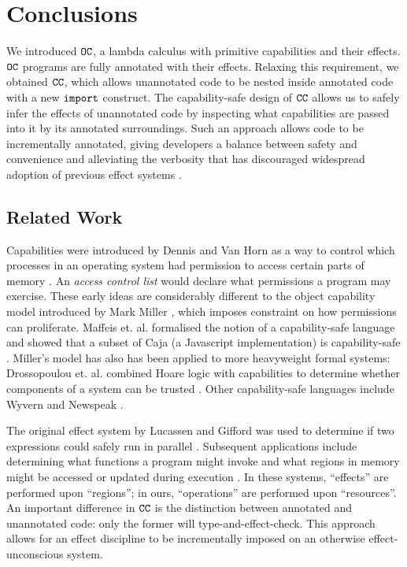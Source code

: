 
\section{Conclusions}

We introduced $\mathtt{OC}$, a lambda calculus with primitive capabilities and their effects. $\mathtt{OC}$ programs are fully annotated with their effects. Relaxing this requirement, we obtained $\mathtt{CC}$, which allows unannotated code to be nested inside annotated code with a new $\mathtt{import}$ construct. The capability-safe design of $\mathtt{CC}$ allows us to safely infer the effects of unannotated code by inspecting what capabilities are passed into it by its annotated surroundings. Such an approach allows code to be incrementally annotated, giving developers a balance between safety and convenience and alleviating the verbosity that has discouraged widespread adoption of previous effect systems \cite{rytz2012}.

\subsection{Related Work}

Capabilities were introduced by Dennis and Van Horn as a way to control which processes in an operating system had permission to access certain parts of memory \cite{dennis66}. An \textit{access control list} would declare what permissions a program may exercise. These early ideas are considerably different to the object capability model introduced by Mark Miller \cite{miller06}, which imposes constraint on how permissions can proliferate. Maffeis et. al. formalised the notion of a capability-safe language and showed that a subset of Caja (a Javascript implementation) is capability-safe \cite{maffeis10}. Miller's model has also has been applied to more heavyweight formal systems: Drossopoulou et. al. combined Hoare logic with capabilities to determine whether components of a system can be trusted \cite{drossopoulou07}. Other capability-safe languages include Wyvern \cite{nistor13} and Newspeak \cite{bracha10}.

The original effect system by Lucassen and Gifford was used to determine if two expressions could safely run in parallel \cite{lucassen88}. Subsequent applications include determining what functions a program might invoke \cite{tang94} and what regions in memory might be accessed or updated during execution \cite{talpin94}. In these systems, ``effects'' are performed upon ``regions''; in ours, ``operations'' are performed upon ``resources''. An important difference in $\mathtt{CC}$ is the distinction between annotated and unannotated code: only the former will type-and-effect-check. This approach allows for an effect discipline to be incrementally imposed on an otherwise effect-unconscious system.

